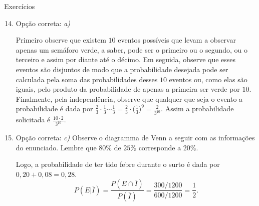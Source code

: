 \begin{answer}{Exercícios}
{\exerciselist
\begin{enumerate}\setcounter{enumi}{13}
\item Opção correta: \textit{a)}

Primeiro observe que existem $10$ eventos possíveis que levam a observar apenas um semáforo verde, a saber, pode ser o primeiro ou o segundo, ou o terceiro e assim por diante até o décimo. Em seguida, observe que esses eventos são disjuntos de modo que a probabilidade desejada pode ser calculada pela soma das probabilidades desses $10$ eventos ou, como elas são iguais, pelo produto da probabilidade de apenas a primeira ser verde por $10$. Finalmente, pela independência, observe que qualquer que seja o evento a probabilidade é dada por $\frac{2}{3}\cdot\frac{1}{3}\cdots\frac{1}{3}=\frac{2}{3}\cdot\big(\frac{1}{3}\big)^9=\frac{2}{3^10}$. Assim a probabilidade solicitada é $\frac{10\cdot2}{3^10}$.

\item Opção correta: \textit{c)}
Observe o diagramma de Venn a seguir com as informações do enunciado. Lembre que $80\%$ de $25\%$ corresponde a $20\%$.

\begin{figure}[H]
\centering

\resizebox{.4\linewidth}{!}
{
}
\end{figure}

Logo, a probabilidade de ter tido febre durante o surto é dada por $0{,}20+0{,}08=0{,}28$.
\begin{equation*}
P(E|\overline{I})=\frac{P(E\cap \overline{I})}{P(\overline{I})}=\frac{300/1200}{600/1200}=\frac{1}{2}.
\end{equation*}


\end{enumerate}}
\end{answer}
